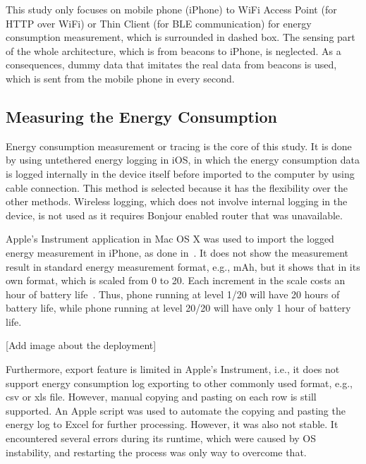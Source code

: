 \documentclass[journal]{vgtc}                %
\begin{document}
This study only focuses on mobile phone (iPhone) to WiFi Access Point (for HTTP over WiFi) or Thin Client (for BLE communication) for energy consumption measurement, which is surrounded in dashed box. The sensing part of the whole architecture, which is from beacons to iPhone, is neglected. As a consequences, dummy data that imitates the real data from beacons is used, which is sent from the mobile phone in every second.

\subsection{Measuring the Energy Consumption} %
\label{sub:tracing_}
Energy consumption measurement or tracing is the core of this study. It is done by using untethered energy logging in iOS, in which the energy consumption data is logged internally in the device itself before imported to the computer by using cable connection. This method is selected because it has the flexibility over the other methods. Wireless logging, which does not involve internal logging in the device, is not used as it requires Bonjour enabled router that was unavailable.

Apple's Instrument application in Mac OS X was used to import the logged energy measurement in iPhone, as done in~\cite{Conte2014}. It does not show the measurement result in standard energy measurement format, e.g., mAh, but it shows that in its own format, which is scaled from 0 to 20. Each increment in the scale costs an hour of battery life~\cite{Lucchesi2014}. Thus, phone running at level 1/20 will have 20 hours of battery life, while phone running at level 20/20 will have only 1 hour of battery life.

[Add image about the deployment]

Furthermore, export feature is limited in Apple's Instrument, i.e., it does not support energy consumption log exporting to other commonly used format, e.g., csv or xls file. However, manual copying and pasting on each row is still supported. An Apple script was used to automate the copying and pasting the energy log to Excel for further processing. However, it was also not stable. It encountered several errors during its runtime, which were caused by OS instability, and restarting the process was only way to overcome that.
\end{document}
